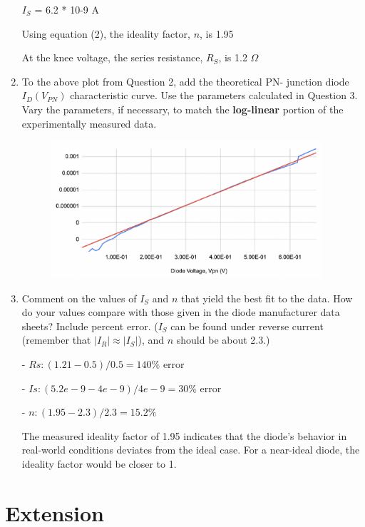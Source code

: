 \documentclass[12pt]{article}
\begin{document}
\begin{enumerate}
$I_S$ = 6.2 * 10-9 A

Using equation (2), the ideality factor, $n$, is 1.95

At the knee voltage, the series resistance, $R_S$, is 1.2 $\Omega$

\item To the above plot from Question 2, add the theoretical PN-
junction diode $I_D(V_{PN})$ characteristic curve. Use the
parameters calculated in Question 3. Vary the parameters, if
necessary, to match the \textbf{log-linear} portion of the
experimentally measured data.

\begin{figure}[h]
    \centering
    \includegraphics[width=0.95\textwidth]{q3_plot.png}
    \caption{}
    \label{fig:colored-leds-23}
\end{figure}

\item Comment on the values of $I_S$ and $n$ that yield the best
fit to the data. How do your values compare with those given in
the diode manufacturer data sheets? Include percent error. ($I_S$
can be found under reverse current (remember that $|I_R|\approx|
I_S|$), and $n$ should be about 2.3.)

- $Rs: (1.21 - 0.5) / 0.5 = 140\%$ error


- $Is: (5.2e-9 - 4e-9) / 4e-9 = 30\%$ error


- $n: (1.95 - 2.3) / 2.3 = 15.2\%$ 

The measured ideality factor of 1.95 indicates that the diode's behavior 
in real-world conditions deviates from the ideal case. For a 
near-ideal diode, the ideality factor would be closer to 1.

\end{enumerate}
\newpage
\section{Extension}
\end{document}
